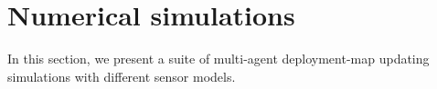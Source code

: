 \documentclass[journal]{IEEEtran}
\begin{document}




\section{Numerical simulations}
\label{sec:sec7}
In this section, we present a suite of multi-agent deployment-map updating simulations with different sensor models.

%
%
%

%
\end{document}
